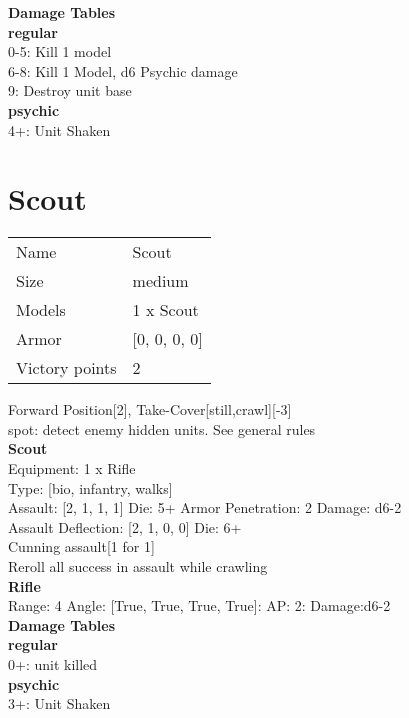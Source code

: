 { 





{\bf Damage Tables} \\
 {\bf regular } \\
0-5: Kill 1 model \\
6-8: Kill 1 Model, d6 Psychic damage \\
9: Destroy unit base \\
 {\bf psychic } \\
4+: Unit Shaken \\




}





\pagebreak\pagebreak

\section{ Scout }

\begin{tabular}{ll}
  Name & Scout \\
  Size & medium\\
  Models & 1 x Scout\\
  Armor & [0, 0, 0, 0]\\
  Victory points & 2\\
\end{tabular}

Forward Position[2], Take-Cover[still,crawl][-3]\\ 
spot: detect enemy hidden units. See general rules\\ 


{\bf Scout } \\
Equipment: 1 x Rifle \\
Type: [bio, infantry, walks] \\

Assault: [2, 1, 1, 1] Die: 5+ Armor Penetration: 2 Damage: d6-2 \\
Assault Deflection: [2, 1, 0, 0] Die: 6+\\
\indent Cunning assault[1 for 1]\\ 
Reroll all success in assault while crawling\\ 
 



{\bf Rifle } \\



Range: 4  Angle: [True, True, True, True]: AP: 2: Damage:d6-2 \\




 





{\bf Damage Tables} \\
 {\bf regular } \\
0+: unit killed \\
 {\bf psychic } \\
3+: Unit Shaken \\










\pagebreak
